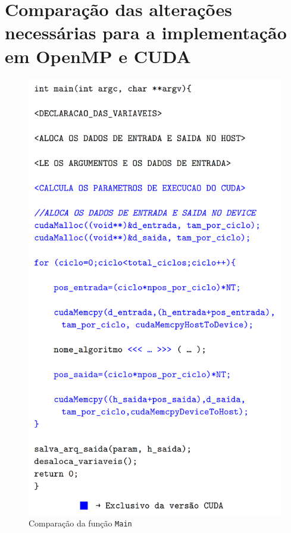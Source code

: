 \section{Comparação das alterações necessárias para a implementação em OpenMP e CUDA}

\begin{figure}[H]
\centering
\includegraphics[]{Imagens/comparacao_codigo/comparacao_codigo_main.png}
\caption{Comparação da função \texttt{Main}}
\label{fig:comparacao_codigo_main}
\end{figure}

